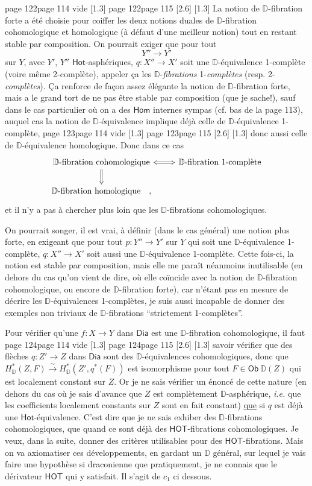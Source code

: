 \documentclass[11pt,leqno]{article}
\newcommand{\printedpage}[1]{\marginnote{\scriptsize\sffamily ed.\ #1}}
\newcommand{\msp}[1]{%
  \begingroup\def\thismsp{#1}\def\blankmsp{page 114 vide}%
  \ifx\thismsp\blankmsp
    \marginnote{\scriptsize\sffamily [114: vide]}[1.3\baselineskip]%
  \else\def\followingmsp{page 115}%
    \ifx\thismsp\followingmsp
      \marginnote{\scriptsize\sffamily [page 115]}[2.6\baselineskip]%
    \else\marginnote{\scriptsize\sffamily [#1]}[1.3\baselineskip]\fi
  \fi\endgroup}
\newcommand{\Dia}{\ensuremath{\mathsf{Dia}}}
\newcommand{\Ob}{\ensuremath{\mathsf{Ob}}}
\newcommand{\Hom}{\ensuremath{\mathsf{Hom}}}
\newcommand{\Hot}{\ensuremath{\mathsf{Hot}}}
\newcommand{\HOT}{\ensuremath{\mathsf{HOT}}}
\newcommand{\D}{\ensuremath{\mathbb{D}}}
\begin{document}
\msp{page 122}La notion de $\D$-fibration forte a été choisie pour coiffer les deux notions duales de $\D$-fibration cohomologique et homologique (à défaut d'une meilleur notion) tout en restant stable par composition. On pourrait exiger que pour tout %
\[
Y'' \longrightarrow Y'
\]
sur $Y$, avec $Y'$, $Y''$ \Hot-asphériques, $q : X'' \to X'$ soit une $\D$-équivalence 1-complète (voire même 2-complète), appeler ça les $\D$-\textit{fibrations} 1-\textit{complètes} (resp. 2-\textit{complètes}). Ça renforce de façon assez élégante la notion de $\D$-fibration forte, mais a le grand tort de ne pas être stable par composition (que je sache!), sauf dans le cas particulier où on a des \underline{\Hom} internes sympas (cf. bas de la page 113), auquel cas la notion de $\D$-équivalence implique déjà celle de $\D$-équivalence 1-complète,
\printedpage{73}
\msp{page 123}donc aussi celle de $\D$-équivalence homologique. Donc dans ce cas
\[
\begin{tikzcd}
\text{$\D$-fibration cohomologique} \arrow[r, Leftrightarrow] \arrow[d, Rightarrow] & \text{$\D$-fibration 1-complète} \\
\text{$\D$-fibration homologique} \quad , &
\end{tikzcd}
\]
et il n'y a pas à chercher plus loin que les $\D$-fibrations cohomologiques.

On pourrait songer, il est vrai, à définir (dans le cas général) une notion plus forte, en exigeant que pour tout $p : Y'' \to Y'$ sur $Y$ qui soit une $\D$-équivalence 1-complète, $q : X'' \to X'$ soit aussi une $\D$-équivalence 1-complète. Cette fois-ci, la notion est stable par composition, mais elle me paraît néanmoins inutilisable (en dehors du cas qu'on vient de dire, où elle coïncide avec la notion de $\D$-fibration cohomologique, ou encore de $\D$-fibration forte), car n'étant pas en mesure de décrire les $\D$-équivalences 1-complètes, je suis aussi incapable de donner des exemples non triviaux de $\D$-fibrations “strictement 1-complètes”.

Pour vérifier qu'une $f : X \to Y$ dans \Dia{} est une $\D$-fibration cohomologique, il faut
\msp{page 124}savoir vérifier que des flèches $q : Z' \to Z$ dans \Dia{} sont des $\D$-équivalences cohomologiques, donc que $H^*_{\D}(Z,F) \overset{\sim}{\rightarrow} H^*_{\D}(Z',q^*(F))$ est isomorphisme pour tout $F \in \Ob\ \D(Z)$ qui est localement constant sur $Z$. Or je ne sais vérifier un énoncé de cette nature (en dehors du cas où je sais d'avance que $Z$ est complètement $\D$-asphérique, \textit{i.e.} que les coefficients localement constants sur $Z$ sont en fait constant) \underline{que} si $q$ est déjà une \Hot-équivalence. %
C'est dire que je ne sais exhiber des $\D$-fibrations cohomologiques, que quand ce sont déjà des \HOT-fibrations cohomologiques. Je veux, dans la suite, donner des critères utilisables pour des \HOT-fibrations. Mais on va axiomatiser ces développements, en gardant un $\D$ général, sur lequel je vais faire une hypothèse si draconienne que pratiquement, je ne connais que le dérivateur \HOT{} qui y satisfait. Il s'agit de $c_1$ ci dessous.
\end{document}
